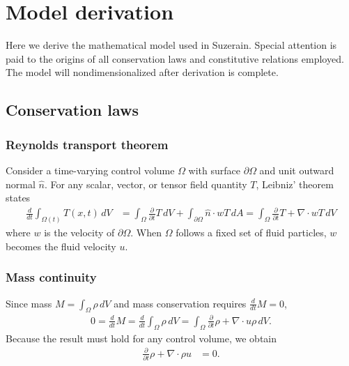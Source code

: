 \documentclass[letterpaper,11pt,nointlimits,reqno,draft]{amsart}
\begin{document}
\tableofcontents

\section{Model derivation}
\label{sec:derivation}

Here we derive the mathematical model used in Suzerain.  Special attention is
paid to the origins of all conservation laws and constitutive relations
employed.  The model will nondimensionalized after derivation is complete.

\subsection{Conservation laws}

\subsubsection{Reynolds transport theorem}

Consider a time-varying control volume $\Omega$ with surface
$\partial\Omega$ and unit outward normal $\hat{n}$.  For any
scalar, vector, or tensor field quantity
$T$, Leibniz' theorem states
\begin{align}
  \label{eq:rtt}
  \frac{d}{dt}\int_{\Omega(t)}T(x,t)\,dV
  &=
  \int_{\Omega}\frac{\partial}{\partial{}t}T\,dV
  +
  \int_{\partial\Omega} \hat{n}\cdot{}w T\,dA
  =
  \int_{\Omega}\frac{\partial}{\partial{}t}T+\nabla\cdot{}wT\,dV
\end{align}
where $w$ is the velocity of $\partial\Omega$.  When $\Omega$ follows
a fixed set of fluid particles, $w$ becomes the fluid velocity $u$.

\subsubsection{Mass continuity}
Since mass $M=\int_{\Omega} \rho\,dV$
and mass conservation requires $\frac{d}{dt}M=0$,
\begin{align}
  0 = \frac{d}{dt}M
  = \frac{d}{dt}\int_{\Omega} \rho\,dV
  =
  \int_{\Omega}\frac{\partial}{\partial{}t}\rho+\nabla\cdot{}u\rho{}\,dV.
\end{align}
Because the result must hold for any control volume, we obtain
\begin{align}
  \label{eq:cons_mass}
  \frac{\partial}{\partial{}t}\rho+\nabla\cdot\rho{}u &= 0
  .
\end{align}
\end{document}
